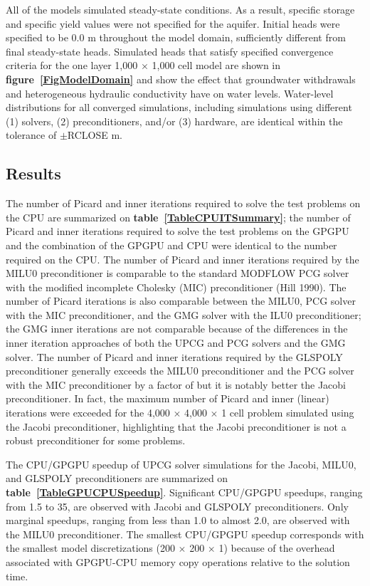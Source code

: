 \documentclass[12pt]{article}
\begin{document}
All of the models simulated steady-state conditions. As a result, specific storage and specific yield values were not specified for the aquifer. Initial heads were specified to be 0.0 m throughout the model domain, sufficiently different from final steady-state heads. Simulated heads \color{cyan} that satisfy specified convergence criteria \color{black} for the one layer 1,000 $\times$ 1,000 cell model are shown in \textbf{figure~\ref{FigModelDomain}} and show the effect that groundwater withdrawals and heterogeneous hydraulic conductivity have on water levels. \color{cyan}Water-level distributions for all converged simulations, including simulations using different (1) solvers, (2) preconditioners, and/or (3) hardware, are identical within the tolerance of $\pm$RCLOSE m.\color{black}

\subsection*{Results}
\color{blue}The number of Picard and inner iterations required to solve the test problems on the CPU are summarized on \textbf{table~\ref{TableCPUITSummary}}; the number of Picard and inner iterations required to solve the test problems on the GPGPU and the combination of the GPGPU and CPU were identical to the number required on the CPU. The number of Picard and inner iterations required by the MILU0 preconditioner is comparable to the standard MODFLOW PCG solver with the modified incomplete Cholesky (MIC) preconditioner (Hill 1990). The number of Picard iterations is also comparable between the MILU0, PCG solver with the MIC preconditioner, and the GMG solver with the ILU0 preconditioner; the GMG inner iterations are not comparable because of the differences in the inner iteration approaches of both the UPCG and PCG solvers and the GMG solver. The number of Picard and inner iterations required by the GLSPOLY preconditioner generally exceeds the MILU0 preconditioner and the PCG solver with the MIC preconditioner by a factor of but it is notably better the Jacobi preconditioner. In fact, the maximum number of Picard and inner (linear) iterations were exceeded for the 4,000 $\times$ 4,000 $\times$ 1 cell problem simulated using the Jacobi preconditioner, highlighting that the Jacobi preconditioner is not a robust preconditioner for some problems.\color{black}

The CPU/GPGPU speedup of UPCG solver simulations for the Jacobi, MILU0, and GLSPOLY preconditioners are summarized on \textbf{table~\ref{TableGPUCPUSpeedup}}. Significant  CPU/GPGPU speedups, ranging from 1.5 to 35, are observed with Jacobi and GLSPOLY preconditioners. Only marginal speedups, ranging from less than 1.0 to almost 2.0, are observed with the MILU0 preconditioner. The smallest CPU/GPGPU speedup corresponds with the smallest model discretizations (200 $\times$ 200 $\times$ 1) because of the overhead associated with GPGPU-CPU memory copy operations relative to the solution time. 
 
\end{document}
